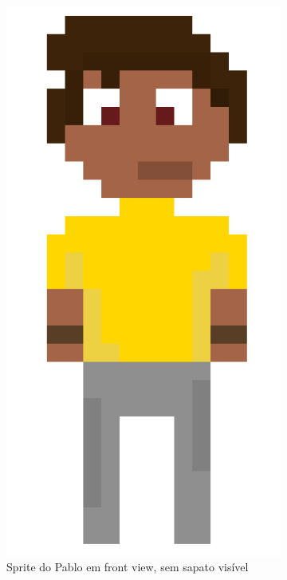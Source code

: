 \begin{figure}[htbp]
    \centering
    \caption{\small Comparação do sprite em front view com os sprites em side view das animações geradas no Gemini Pro}
    \label{fig:GeminiProAndarComparaSprite}
    \begin{subfigure}{0.32\linewidth}
        \centering
        \includegraphics[width=0.7\linewidth]{figs/sprites/Pablo.PNG}
        \caption{\small Sprite do Pablo em front view, sem sapato visível}
        \label{fig:GeminiProAndaPablo}
    \end{subfigure}
    \begin{subfigure}{0.32\linewidth}
        \centering

\end{subfigure}
\end{figure}
